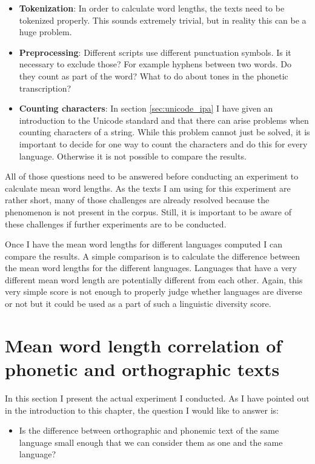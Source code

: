 \begin{itemize}
    \item \textbf{Tokenization}: In order to calculate word lengths, the texts need to be tokenized properly. This sounds extremely trivial, but in reality this can be a huge problem.
    \item \textbf{Preprocessing}: Different scripts use different punctuation symbols. Is it necessary to exclude those? For example hyphens between two words. Do they count as part of the word? What to do about tones in the phonetic transcription?
    \item \textbf{Counting characters}: In section \ref{sec:unicode_ipa} I have given an introduction to the Unicode standard and that there can arise problems when counting characters of a string. While this problem cannot just be solved, it is important to decide for one way to count the characters and do this for every language. Otherwise it is not possible to compare the results. 
\end{itemize}

All of those questions need to be answered before conducting an experiment to calculate mean word lengths. As the texts I am using for this experiment are rather short, many of those challenges are already resolved because the phenomenon is not present in the corpus. Still, it is important to be aware of these challenges if further experiments are to be conducted.

Once I have the mean word lengths for different languages computed I can compare the results. A simple comparison is to calculate the difference between the mean word lengths for the different languages. Languages that have a very different mean word length are potentially different from each other. Again, this very simple score is not enough to properly judge whether languages are diverse or not but it could be used as a part of such a linguistic diversity score.


\section{Mean word length correlation of phonetic and orthographic texts}
\label{sec:mean-len-experiment}
In this section I present the actual experiment I conducted. As I have pointed out in the introduction to this chapter, the question I would like to answer is:

\begin{itemize}
    \item Is the difference between orthographic and phonemic text of the same language small enough that we can consider them as one and the same language?
\end{itemize}

